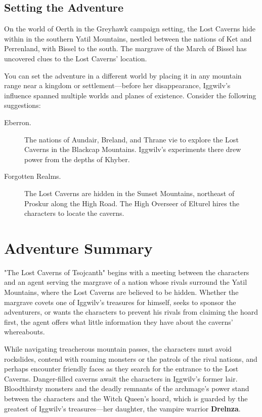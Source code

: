 \documentclass[10pt,a4paper,twoside,bg=print,twocolumn,openany,nodeprecatedcode]{dndbook}
\begin{document}
\subsection{Setting the Adventure}
On the world of Oerth in the Greyhawk campaign setting, the Lost Caverns hide within in the southern Yatil Mountains, nestled between the nations of Ket and Perrenland, with Bissel to the south. The margrave of the March of Bissel has uncovered clues to the Lost Caverns' location.

You can set the adventure in a different world by placing it in any mountain range near a kingdom or settlement—before her disappearance, Iggwilv's influence spanned multiple worlds and planes of existence. Consider the following suggestions:


\begin{description}
\item[Eberron.]
The nations of Aundair, Breland, and Thrane vie to explore the Lost Caverns in the Blackcap Mountains. Iggwilv's experiments there drew power from the depths of Khyber.
\item[Forgotten Realms.]
The Lost Caverns are hidden in the Sunset Mountains, northeast of Proskur along the High Road. The High Overseer of Elturel hires the characters to locate the caverns.
\end{description}

\section{Adventure Summary}
"The Lost Caverns of Tsojcanth" begins with a meeting between the characters and an agent serving the margrave of a nation whose rivals surround the Yatil Mountains, where the Lost Caverns are believed to be hidden. Whether the margrave covets one of Iggwilv's treasures for himself, seeks to sponsor the adventurers, or wants the characters to prevent his rivals from claiming the hoard first, the agent offers what little information they have about the caverns' whereabouts.

While navigating treacherous mountain passes, the characters must avoid rockslides, contend with roaming monsters or the patrols of the rival nations, and perhaps encounter friendly faces as they search for the entrance to the Lost Caverns. Danger-filled caverns await the characters in Iggwilv's former lair. Bloodthirsty monsters and the deadly remnants of the archmage's power stand between the characters and the Witch Queen's hoard, which is guarded by the greatest of Iggwilv's treasures—her daughter, the vampire warrior \textbf{Drelnza}.
\end{document}
